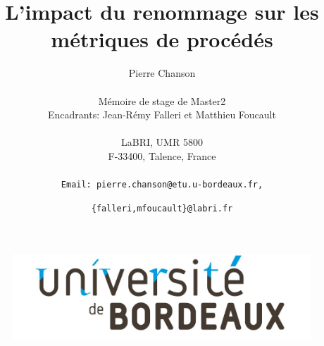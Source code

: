 \documentclass[12pt,a4paper]{article}
\title{\vspace{4cm}\textbf{L'impact du renommage sur les métriques de procédés}\vspace{3cm}}
\author{
Pierre Chanson\\\\
Mémoire de stage de Master2\\
Encadrants: Jean-Rémy Falleri et Matthieu Foucault\\\\
LaBRI, UMR 5800\\
F-33400, Talence, France\\\\
\texttt{Email: pierre.chanson@etu.u-bordeaux.fr,}\and
\texttt{\{falleri,mfoucault\}@labri.fr}\\
}
\begin{document}
\begin{figure}[t]
\center
\includegraphics[scale=0.25]{data/figures/UnivBordeaux.jpg}
\end{figure}
\maketitle
\tableofcontents
\newpage






\newpage


%
\end{document}
